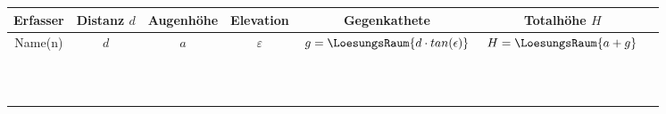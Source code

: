 


\renewcommand{\metaHeaderLine}{Arbeitsblatt}
\renewcommand{\arbeitsblattTitel}{Höhenmessung}

\arbeitsblattHeader{}



\begin{center}
\end{center}

\newcommand{\noteSpace}{\noTRAINER{\rule{0pt}{6.5ex}}}

\begin{tabular}{|c|c|c|c|c|c|c|}
\hline
Erfasser & Distanz $d$ & Augenhöhe & Elevation & Gegenkathete & Totalhöhe $H$ \\
\hline
Name(n) & $d$ & $a$ & $\varepsilon$ &  $g=\LoesungsRaum{d\cdot tan(\epsilon)}$ & $H=\LoesungsRaum{a + g}$ \\
\hline
\noteSpace{}&&&&&\\
\hline
\noteSpace{}&&&&&\\
\hline
\noteSpace{}&&&&&\\
\hline
\noteSpace{}&&&&&\\
\hline
\noteSpace{}&&&&&\\
\hline
\noteSpace{}&&&&&\\
\hline
\noteSpace{}&&&&&\\
\hline
\noteSpace{}&&&&&\\
\hline
\noteSpace{}&&&&&\\
\hline
\noteSpace{}&&&&&\\
\hline
\noteSpace{}&&&&&\\
\hline
\end{tabular}



